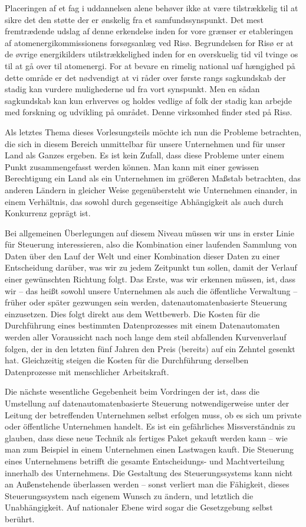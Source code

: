 {Placeringen af et fag i uddannelsen alene behøver ikke at være tilstrækkelig til at sikre det den støtte der er ønskelig fra et samfundssynspunkt. Det mest fremtrædende udslag af denne erkendelse inden for vore grænser er etableringen af atomenergikommissionens forsøgsanlæg ved Risø. Begrundelsen for Risø er at de øvrige energikilders utilstrækkelighed inden for en overskuelig tid vil tvinge os til at gå over til atomenergi. For at bevare en rimelig national uaf hængighed på dette område er det nødvendigt at vi råder over første rangs sagkundskab der stadig kan vurdere mulighederne ud fra vort synspunkt. Men en sådan sagkundskab kan kun erhverves og holdes vedlige af folk der stadig kan arbejde med forskning og udvikling på området. Denne virksomhed finder sted på Risø. 
}{
Als letztes Thema dieses Vorlesungsteils möchte ich nun die Probleme betrachten, die sich in diesem Bereich unmittelbar für unsere Unternehmen und für unser Land als Ganzes ergeben. Es ist kein Zufall, dass diese Probleme unter einem Punkt zusammengefasst werden können. Man kann mit einer gewissen Berechtigung ein Land als ein Unternehmen im größeren Maßstab betrachten, das anderen Ländern in gleicher Weise gegenübersteht wie Unternehmen einander, in einem Verhältnis, das sowohl durch gegenseitige Abhängigkeit als auch durch Konkurrenz geprägt ist.

Bei allgemeinen Überlegungen auf diesem Niveau müssen wir uns in erster Linie für Steuerung interessieren, also die Kombination einer laufenden Sammlung von Daten über den Lauf der Welt und einer Kombination dieser Daten zu einer Entscheidung darüber, was wir zu jedem Zeitpunkt tun sollen, damit der Verlauf einer gewünschten Richtung folgt. Das Erste, was wir erkennen müssen, ist, dass wir -- das heißt sowohl unsere Unternehmen als auch die öffentliche Verwaltung -- früher oder später gezwungen sein werden, datenautomatenbasierte Steuerung einzusetzen. Dies folgt direkt aus dem Wettbewerb. Die Kosten für die Durchführung eines bestimmten Datenprozesses mit einem Datenautomaten werden aller Voraussicht nach noch lange dem steil abfallenden Kurvenverlauf folgen, der in den letzten fünf Jahren den Preis (bereits) auf ein Zehntel gesenkt hat. Gleichzeitig steigen die Kosten für die Durchführung derselben Datenprozesse mit menschlicher Arbeitskraft.

Die nächste wesentliche Gegebenheit beim Vordringen der  ist, dass die Umstellung auf datenautomatenbasierte Steuerung notwendigerweise unter der Leitung der betreffenden Unternehmen selbst erfolgen muss, ob es sich um private oder öffentliche Unternehmen handelt. Es ist ein gefährliches Missverständnis zu glauben, dass diese neue Technik als fertiges Paket gekauft werden kann -- wie man zum Beispiel in einem Unternehmen einen Lastwagen kauft. Die Steuerung eines Unternehmens betrifft die gesamte Entscheidungs- und Machtverteilung innerhalb des Unternehmens. Die Gestaltung des Steuerungssystems kann nicht an Außenstehende überlassen werden -- sonst verliert man die Fähigkeit, dieses Steuerungssystem nach eigenem Wunsch zu ändern, und letztlich die Unabhängigkeit. Auf nationaler Ebene wird sogar die Gesetzgebung selbst berührt.

}
